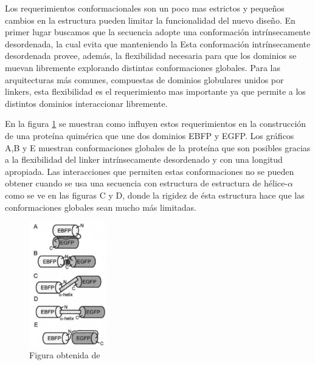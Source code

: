 Los requerimientos conformacionales son un poco mas estrictos y pequeños cambios en la estructura pueden limitar la funcionalidad del nuevo diseño.
En primer lugar buscamos que la secuencia adopte una conformación intrínsecamente desordenada, la cual evita que       manteniendo la
Esta conformación intrínsecamente desordenada provee, además, la flexibilidad necesaria para que los dominios se muevan libremente explorando distintas conformaciones globales.
Para las arquitecturas más comunes, compuestas de dominios globulares unidos por linkers, esta flexibilidad es el requerimiento mas importante ya que permite a los distintos dominios interaccionar libremente.

En la figura \ref{conformacionLinker} se muestran como influyen estos requerimientos en la construcción de una proteína quimérica que une dos dominios EBFP y EGFP. 
Los gráficos A,B y E muestran conformaciones globales de la proteína que son posibles gracias a la flexibilidad del linker intrínsecamente desordenado y con una longitud apropiada. 
Las interacciones que permiten estas conformaciones no se pueden obtener cuando se usa una secuencia con estructura de estructura de hélice-$\alpha$ como se ve en las figuras C y D, donde la rigidez de ésta estructura 
hace que las conformaciones globales sean mucho más limitadas.


\begin{figure}[htbp]
\centering
\includegraphics[width=0.3\textwidth]{img/conformacionLinker.png} 
\caption{Figura obtenida de \cite{arai2004conformations}}
\label{conformacionLinker}
\end{figure}



